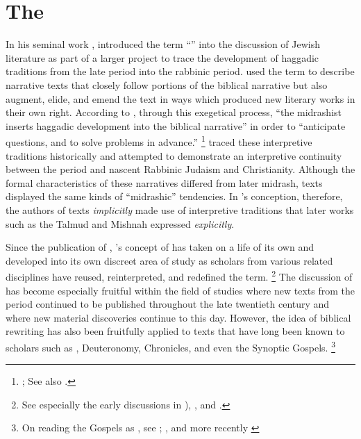 
\chapter{The \RwB}
\label{chap:rwb}

In his seminal work , \Vermes introduced the term ``\rwB'' into the discussion of \secondtemple Jewish literature as part of a larger project to trace the development of haggadic traditions from the late \secondtemple period into the rabbinic period. \vermes used the term \rwB to describe narrative texts that closely follow portions of the biblical narrative but also augment, elide, and emend the text in ways which produced new literary works in their own right. According to \vermes, through this exegetical process, ``the midrashist inserts haggadic development into the biblical narrative'' in order to ``anticipate questions, and to solve problems in advance.''%
    \footnote{%
        \cite[95]{vermes1961}; See also
        \cite{vermes_zsengeller2014}.}
\vermes traced these interpretive traditions historically and attempted to demonstrate an interpretive continuity between the \secondtemple period and nascent Rabbinic Judaism and Christianity. Although the formal characteristics of these narratives differed from later midrash, \rwB texts displayed the same kinds of ``midrashic'' tendencies. In \vermes's conception, therefore, the authors of \rwB texts \emph{implicitly} made use of interpretive traditions that later works such as the Talmud and Mishnah expressed \emph{explicitly}. 

Since the publication of , \vermes's concept of \rwB has taken on a life of its own and developed into its own discreet area of study as scholars from various related disciplines have reused, reinterpreted, and redefined the term.%
    \footnote{See especially the early discussions in \cite{alexander_carson-williamson1988}), \cite{nickelsburg_stone1984}, and \cite{harrington_kraft-nickelsburg1986}.}
The discussion of \rwb has become especially fruitful within the field of \qumran studies where new texts from the \secondtemple period continued to be published throughout the late twentieth century and where new material discoveries continue to this day. However, the idea of biblical rewriting has also been fruitfully applied to texts that have long been known to scholars such as \jub, Deuteronomy, Chronicles, and even the Synoptic Gospels.%
    \footnote{On reading the Gospels as \rwb, see \cite{müller_back-kankaanniemi2012}; \cite{malan_hts2014}, and more recently \cite{allen_jsnt2018}}

